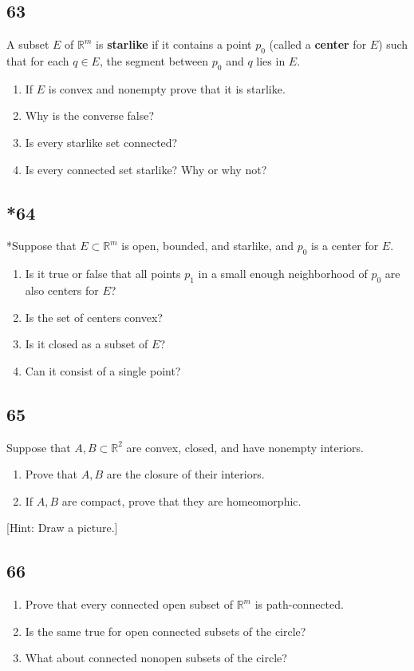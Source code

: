 \documentclass{amsart}
\begin{document}
\subsection*{63}
A subset $E$ of $\mathbb{R}^m$ is \textbf{starlike} if it contains a point $p_0$ (called a \textbf{center} for $E$) such that for each $q \in E$, the segment between $p_0$ and $q$ lies in $E$.
\begin{enumerate}[label=(\alph*)]
\item If $E$ is convex and nonempty prove that it is starlike.
\item Why is the converse false?
\item Is every starlike set connected?
\item Is every connected set starlike? Why or why not?
\end{enumerate}

\subsection*{*64}
*Suppose that $E \subset \mathbb{R}^m$ is open, bounded, and starlike, and $p_0$ is a center for $E$.
\begin{enumerate}[label=(\alph*)]
\item Is it true or false that all points $p_1$ in a small enough neighborhood of $p_0$ are also centers for $E$?
\item Is the set of centers convex?
\item Is it closed as a subset of $E$?
\item Can it consist of a single point?
\end{enumerate}

\subsection*{65}
Suppose that $A, B \subset \mathbb{R}^2$ are convex, closed, and have nonempty interiors.
\begin{enumerate}[label=(\alph*)]
\item Prove that $A, B$ are the closure of their interiors.
\item If $A, B$ are compact, prove that they are homeomorphic.
\end{enumerate}
[Hint: Draw a picture.]

\subsection*{66}
\begin{enumerate}[label=(\alph*)]
\item Prove that every connected open subset of $\mathbb{R}^m$ is path-connected.
\item Is the same true for open connected subsets of the circle?
\item What about connected nonopen subsets of the circle?
\end{enumerate}
\end{document}
